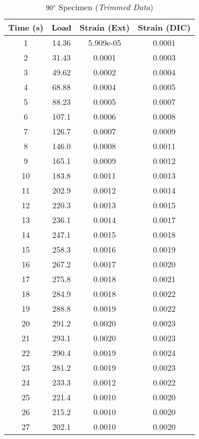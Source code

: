 \begin{table}[!h]
    \centering
    \caption{$90\degree$ Specimen (\textit{Trimmed Data})}
    \begin{tabular}{|c||c|c|c|}\toprule
        \textbf{Time (s)} & \textbf{Load} & \textbf{Strain (Ext)} & \textbf{Strain (DIC)}\\\midrule
        1 & 14.36 & 5.909e-05  & 0.0001 \\\hline
        2 & 31.43 & 0.0001 & 0.0003 \\\hline
        3 & 49.62 & 0.0002 & 0.0004 \\\hline
        4 & 68.88 & 0.0004 & 0.0005 \\\hline
        5 & 88.23 & 0.0005 & 0.0007 \\\hline
        6 & 107.1 & 0.0006 & 0.0008 \\\hline
        7 & 126.7 & 0.0007 & 0.0009 \\\hline
        8 & 146.0 & 0.0008 & 0.0011 \\\hline
        9 & 165.1 & 0.0009 & 0.0012 \\\hline
        10 & 183.8 & 0.0011 & 0.0013 \\\hline
        11 & 202.9 & 0.0012 & 0.0014 \\\hline
        12 & 220.3 & 0.0013 & 0.0015 \\\hline
        13 & 236.1 & 0.0014 & 0.0017 \\\hline
        14 & 247.1 & 0.0015 & 0.0018 \\\hline
        15 & 258.3 & 0.0016 & 0.0019 \\\hline
        16 & 267.2 & 0.0017 & 0.0020 \\\hline
        17 & 275.8 & 0.0018 & 0.0021 \\\hline
        18 & 284.9 & 0.0018 & 0.0022 \\\hline
        19 & 288.8 & 0.0019 & 0.0022 \\\hline
        20 & 291.2 & 0.0020 & 0.0023 \\\hline
        21 & 293.1 & 0.0020 & 0.0023 \\\hline
        22 & 290.4 & 0.0019 & 0.0024 \\\hline
        23 & 281.2 & 0.0019 & 0.0023 \\\hline
        24 & 233.3 & 0.0012 & 0.0022 \\\hline
        25 & 221.4 & 0.0010 & 0.0020 \\\hline
        26 & 215.2 & 0.0010 & 0.0020 \\\hline
        27 & 202.1 & 0.0010 & 0.0020 \\\hline

\end{tabular}
\end{table}
